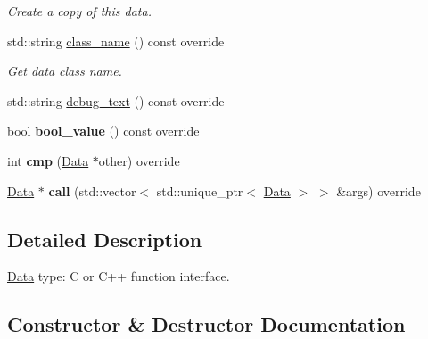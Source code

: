 \begin{DoxyCompactItemize}
\begin{DoxyCompactList}\small\item\em Create a copy of this data. \end{DoxyCompactList}\item 
std\+::string \hyperlink{classcreek_1_1_c_function_a59c1be0ba7696dcc8290b4d215a46b46}{class\+\_\+name} () const  override\hypertarget{classcreek_1_1_c_function_a59c1be0ba7696dcc8290b4d215a46b46}{}\label{classcreek_1_1_c_function_a59c1be0ba7696dcc8290b4d215a46b46}

\begin{DoxyCompactList}\small\item\em Get data class name. \end{DoxyCompactList}\item 
std\+::string \hyperlink{classcreek_1_1_c_function_a0adf7ffcb7f3a4e8f81f744477dc44b7}{debug\+\_\+text} () const  override
\item 
bool {\bfseries bool\+\_\+value} () const  override\hypertarget{classcreek_1_1_c_function_adc3eaa9566801ba01f10a22beb0781cc}{}\label{classcreek_1_1_c_function_adc3eaa9566801ba01f10a22beb0781cc}

\item 
int {\bfseries cmp} (\hyperlink{classcreek_1_1_data}{Data} $\ast$other) override\hypertarget{classcreek_1_1_c_function_ae81430ffe3a7aae33ed4d345b0717fc6}{}\label{classcreek_1_1_c_function_ae81430ffe3a7aae33ed4d345b0717fc6}

\item 
\hyperlink{classcreek_1_1_data}{Data} $\ast$ {\bfseries call} (std\+::vector$<$ std\+::unique\+\_\+ptr$<$ \hyperlink{classcreek_1_1_data}{Data} $>$ $>$ \&args) override\hypertarget{classcreek_1_1_c_function_a7b4f509ab339bedd175463d58435a23a}{}\label{classcreek_1_1_c_function_a7b4f509ab339bedd175463d58435a23a}

\end{DoxyCompactItemize}


\subsection{Detailed Description}
\hyperlink{classcreek_1_1_data}{Data} type\+: C or C++ function interface. 

\subsection{Constructor \& Destructor Documentation}
